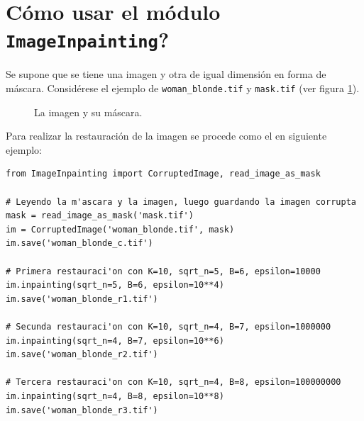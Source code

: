 \section{\textquestiondown C\'omo usar el m\'odulo \texttt{ImageInpainting}?}\label{sec:module_how_to_use}
Se supone que se tiene una imagen y otra de igual dimensión en forma de m\'ascara. Considérese el ejemplo de  \texttt{woman\_blonde.tif} y \texttt{mask.tif} (ver figura \ref{fig:woman_blonde}).
\begin{figure}[H]
	\centering
	\qquad
	\caption{La imagen y su m\'ascara.}
	\label{fig:woman_blonde}
\end{figure}
Para realizar la restauraci\'on de la imagen se procede como el en siguiente ejemplo:
\begin{lstlisting}
from ImageInpainting import CorruptedImage, read_image_as_mask

# Leyendo la m'ascara y la imagen, luego guardando la imagen corrupta
mask = read_image_as_mask('mask.tif')
im = CorruptedImage('woman_blonde.tif', mask)
im.save('woman_blonde_c.tif')

# Primera restauraci'on con K=10, sqrt_n=5, B=6, epsilon=10000 
im.inpainting(sqrt_n=5, B=6, epsilon=10**4)
im.save('woman_blonde_r1.tif')

# Secunda restauraci'on con K=10, sqrt_n=4, B=7, epsilon=1000000
im.inpainting(sqrt_n=4, B=7, epsilon=10**6)
im.save('woman_blonde_r2.tif')

# Tercera restauraci'on con K=10, sqrt_n=4, B=8, epsilon=100000000 
im.inpainting(sqrt_n=4, B=8, epsilon=10**8)
im.save('woman_blonde_r3.tif')
\end{lstlisting}
